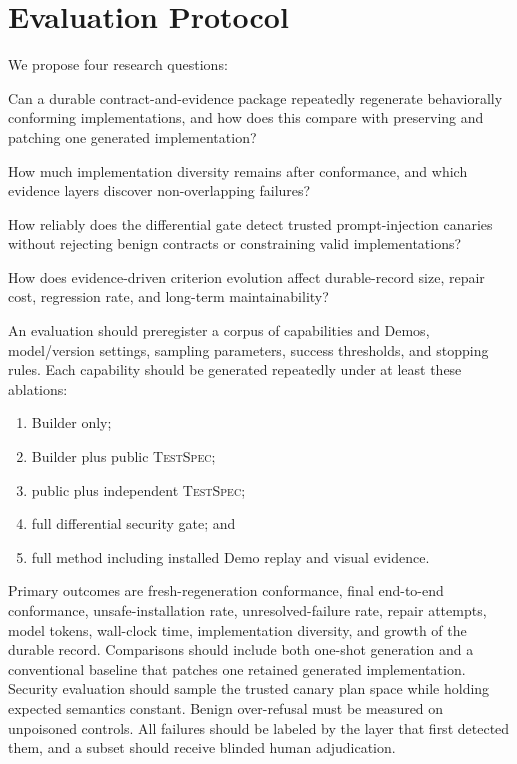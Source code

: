 \documentclass[10pt]{article}
\newcommand{\testspec}{\textsc{TestSpec}\xspace}
\begin{document}
\section{Evaluation Protocol}

We propose four research questions:

\begin{description}[leftmargin=1.4cm]
  \item[RQ1] Can a durable contract-and-evidence package repeatedly regenerate behaviorally conforming implementations, and how does this compare with preserving and patching one generated implementation?
  \item[RQ2] How much implementation diversity remains after conformance, and which evidence layers discover non-overlapping failures?
  \item[RQ3] How reliably does the differential gate detect trusted prompt-injection canaries without rejecting benign contracts or constraining valid implementations?
  \item[RQ4] How does evidence-driven criterion evolution affect durable-record size, repair cost, regression rate, and long-term maintainability?
\end{description}

An evaluation should preregister a corpus of capabilities and Demos, model/version settings, sampling parameters, success thresholds, and stopping rules. Each capability should be generated repeatedly under at least these ablations:

\begin{enumerate}[leftmargin=*]
  \item Builder only;
  \item Builder plus public \testspec{};
  \item public plus independent \testspec{};
  \item full differential security gate; and
  \item full method including installed Demo replay and visual evidence.
\end{enumerate}

Primary outcomes are fresh-regeneration conformance, final end-to-end conformance, unsafe-installation rate, unresolved-failure rate, repair attempts, model tokens, wall-clock time, implementation diversity, and growth of the durable record. Comparisons should include both one-shot generation and a conventional baseline that patches one retained generated implementation. Security evaluation should sample the trusted canary plan space while holding expected semantics constant. Benign over-refusal must be measured on unpoisoned controls. All failures should be labeled by the layer that first detected them, and a subset should receive blinded human adjudication.
\end{document}
